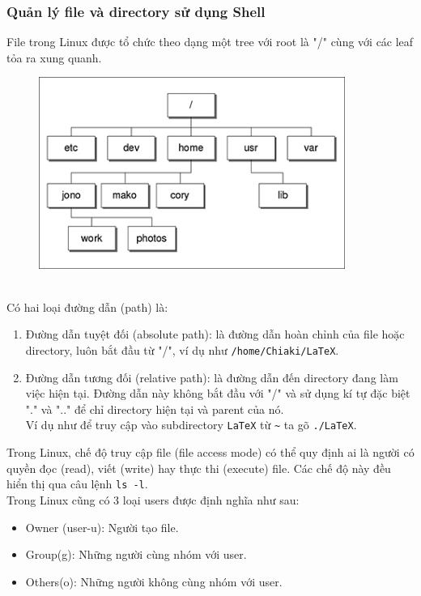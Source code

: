 \documentclass{article}
\begin{document}
 \subsubsection{Quản lý file và directory sử dụng Shell}
 File trong Linux được tổ chức theo dạng một tree với root là "/" cùng với các leaf tỏa ra xung quanh.
 \begin{figure}[h]
    \begin{center}
    \includegraphics[width=10cm]{thfig04-09.jpg}
    \end{center}
    \end{figure} 
\\Có hai loại đường dẫn (path) là:
\begin{enumerate}
    \item Đường dẫn tuyệt đối (absolute path): là đường dẫn hoàn chỉnh của file hoặc directory, luôn bắt đầu từ "/", ví dụ như \verb|/home/Chiaki/LaTeX|.
    \item Đường dẫn tương đối (relative path): là đường dẫn đến directory đang làm việc hiện tại. Đường dẫn này không bắt đầu với "/" và sử dụng kí tự đặc biệt "." và ".." để chỉ directory hiện tại và parent của nó.\\ Ví dụ như để truy cập vào subdirectory \verb|LaTeX| từ \verb|~| ta gõ \verb|./LaTeX|.
\end{enumerate}
Trong Linux, chế độ truy cập file (file access mode) có thể quy định ai là người có quyền đọc (read), viết (write) hay thực thi (execute) file. Các chế độ này đều hiển thị qua câu lệnh \verb|ls -l|.
\\ Trong Linux cũng có 3 loại users được định nghĩa như sau:
\begin{itemize}
    \item Owner (user-u): Người tạo file.
    \item Group(g): Những người cùng nhóm với user.
    \item Others(o): Những người không cùng nhóm với user.
\end{itemize}
\end{document}
